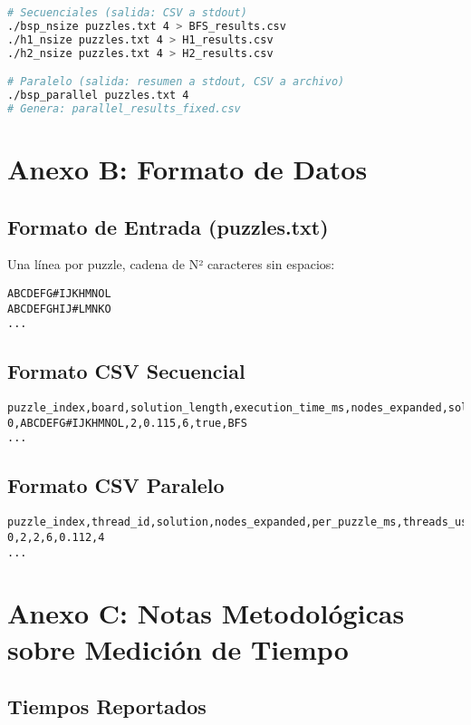 \documentclass[12pt,a4paper]{article}
\begin{document}
\begin{lstlisting}[language=bash]
# Secuenciales (salida: CSV a stdout)
./bsp_nsize puzzles.txt 4 > BFS_results.csv
./h1_nsize puzzles.txt 4 > H1_results.csv
./h2_nsize puzzles.txt 4 > H2_results.csv

# Paralelo (salida: resumen a stdout, CSV a archivo)
./bsp_parallel puzzles.txt 4
# Genera: parallel_results_fixed.csv
\end{lstlisting}

\section{Anexo B: Formato de Datos}

\subsection{Formato de Entrada (puzzles.txt)}

Una línea por puzzle, cadena de N² caracteres sin espacios:
\begin{verbatim}
ABCDEFG#IJKHMNOL
ABCDEFGHIJ#LMNKO
...
\end{verbatim}

\subsection{Formato CSV Secuencial}

\begin{verbatim}
puzzle_index,board,solution_length,execution_time_ms,nodes_expanded,solvable,algorithm
0,ABCDEFG#IJKHMNOL,2,0.115,6,true,BFS
...
\end{verbatim}

\subsection{Formato CSV Paralelo}

\begin{verbatim}
puzzle_index,thread_id,solution,nodes_expanded,per_puzzle_ms,threads_used
0,2,2,6,0.112,4
...
\end{verbatim}

\section{Anexo C: Notas Metodológicas sobre Medición de Tiempo}

\subsection{Tiempos Reportados}
\end{document}
